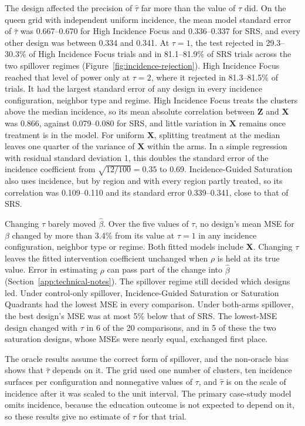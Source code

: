\documentclass[11pt]{article}
\begin{document}
The design affected the precision of \(\hat\tau\) far more than the value of \(\tau\) did. On the queen grid with independent uniform incidence, the mean model standard error of \(\hat\tau\) was 0.667--0.670 for High Incidence Focus and 0.336--0.337 for SRS, and every other design was between 0.334 and 0.341. At \(\tau = 1\), the test rejected in 29.3--30.3\% of High Incidence Focus trials and in 81.1--81.9\% of SRS trials across the two spillover regimes (Figure~\ref{fig:incidence-rejection}). High Incidence Focus reached that level of power only at \(\tau = 2\), where it rejected in 81.3--81.5\% of trials. It had the largest standard error of any design in every incidence configuration, neighbor type and regime. High Incidence Focus treats the clusters above the median incidence, so its mean absolute correlation between \(\mathbf{Z}\) and \(\mathbf{X}\) was 0.866, against 0.079--0.080 for SRS, and little variation in \(\mathbf{X}\) remains once treatment is in the model. For uniform \(\mathbf{X}\), splitting treatment at the median leaves one quarter of the variance of \(\mathbf{X}\) within the arms. In a simple regression with residual standard deviation 1, this doubles the standard error of the incidence coefficient from \(\sqrt{12/100} = 0.35\) to 0.69. Incidence-Guided Saturation also uses incidence, but by region and with every region partly treated, so its correlation was 0.109--0.110 and its standard error 0.339--0.341, close to that of SRS.

Changing \(\tau\) barely moved \(\hat\beta\). Over the five values of \(\tau\), no design's mean MSE for \(\beta\) changed by more than 3.4\% from its value at \(\tau = 1\) in any incidence configuration, neighbor type or regime. Both fitted models include \(\mathbf{X}\). Changing \(\tau\) leaves the fitted intervention coefficient unchanged when \(\rho\) is held at its true value. Error in estimating \(\rho\) can pass part of the change into \(\hat\beta\) (Section~\ref{app:technical-notes}). The spillover regime still decided which designs led. Under control-only spillover, Incidence-Guided Saturation or Saturation Quadrants had the lowest MSE in every comparison. Under both-arms spillover, the best design's MSE was at most 5\% below that of SRS. The lowest-MSE design changed with \(\tau\) in 6 of the 20 comparisons, and in 5 of these the two saturation designs, whose MSEs were nearly equal, exchanged first place.

The oracle results assume the correct form of spillover, and the non-oracle bias shows that \(\hat\tau\) depends on it. The grid used one number of clusters, ten incidence surfaces per configuration and nonnegative values of \(\tau\), and \(\hat\tau\) is on the scale of incidence after it was scaled to the unit interval. The primary case-study model omits incidence, because the education outcome is not expected to depend on it, so these results give no estimate of \(\tau\) for that trial.
\end{document}
